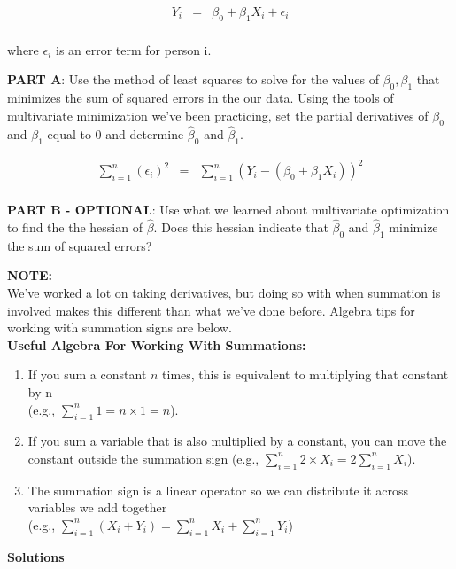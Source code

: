 \documentclass[10pt]{amsart}
\begin{document}
\bigskip
\begin{eqnarray*}
Y_i &=& \beta_0 + \beta_1 X_i + \epsilon_i\\
 \end{eqnarray*}

 where $\epsilon_i$ is an error term for person i.
 
\textbf{PART A}: Use the method of least squares to solve for the values of $\beta_0, \beta_1$ that minimizes the sum of squared errors in the our data. Using the tools of multivariate minimization we've been practicing, set the partial derivatives of $\beta_0$ and $\beta_1$ equal to 0 and determine $\hat \beta_0$ and $\hat \beta_1$. 
 
 \begin{eqnarray*}
 \sum_{i=1}^n (\epsilon_i)^2 &=& \sum_{i=1}^n (Y_i - (\beta_0 + \beta_1 X_i))^2\\
 \end{eqnarray*}
 
 \textbf{PART B - OPTIONAL}: Use what we learned about multivariate optimization to find the the hessian of $\hat \beta$. Does this hessian indicate that $\hat \beta_0$ and $\hat \beta_1$ minimize the sum of squared errors?
 
 \textbf{NOTE:}\\
 We've worked a lot on taking derivatives, but doing so with when summation is involved makes this different than what we've done before. Algebra tips for working with summation signs are below.\\
 
 \textbf{Useful Algebra For Working With Summations:}\\
 \begin{enumerate}
\item  If you sum a constant $n$ times, this is equivalent to multiplying that constant by n\\ (e.g., $\sum_{i=1}^n 1 = n\times1 = n$).
\item If you sum a variable that is also multiplied by a constant, you can move the constant outside the summation sign (e.g., $\sum_{i=1}^n 2 \times X_i = 2\sum_{i=1}^n X_i$).
\item The summation sign is a linear operator so we can distribute it across variables we add together \\(e.g., $\sum_{i=1}^n (X_i + Y_i) =  \sum_{i=1}^n X_i +  \sum_{i=1}^n Y_i$)
\end{enumerate}
 
\textbf{Solutions} 
\end{document}
